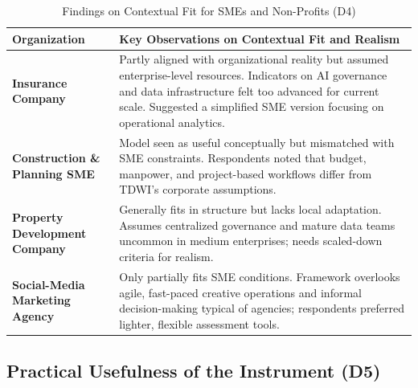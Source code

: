 \documentclass[conference]{IEEEtran}
\begin{document}
\begin{table}[h!]
\centering
\caption{Findings on Contextual Fit for SMEs and Non-Profits (D4)}
\label{tab:d4_contextualfit}
\renewcommand{\arraystretch}{1.2}
\begin{tabular}{p{.16\linewidth} p{.74\linewidth}}
\hline
\textbf{Organization} & \textbf{Key Observations on Contextual Fit and Realism} \\ \hline

\textbf{Insurance Company} & 
Partly aligned with organizational reality but assumed enterprise-level resources.  
Indicators on AI governance and data infrastructure felt too advanced for current scale.  
Suggested a simplified SME version focusing on operational analytics. \\ \hline

\textbf{Construction \& Planning SME} & 
Model seen as useful conceptually but mismatched with SME constraints.  
Respondents noted that budget, manpower, and project-based workflows differ from TDWI’s corporate assumptions. \\ \hline

\textbf{Property Development Company} & 
Generally fits in structure but lacks local adaptation.  
Assumes centralized governance and mature data teams uncommon in medium enterprises; needs scaled-down criteria for realism. \\ \hline

\textbf{Social-Media Marketing Agency} & 
Only partially fits SME conditions.  
Framework overlooks agile, fast-paced creative operations and informal decision-making typical of agencies; respondents preferred lighter, flexible assessment tools. \\ \hline
\end{tabular}
\end{table}


\subsection{Practical Usefulness of the Instrument (D5)}
\label{sec:usefulness_results}
\end{document}
